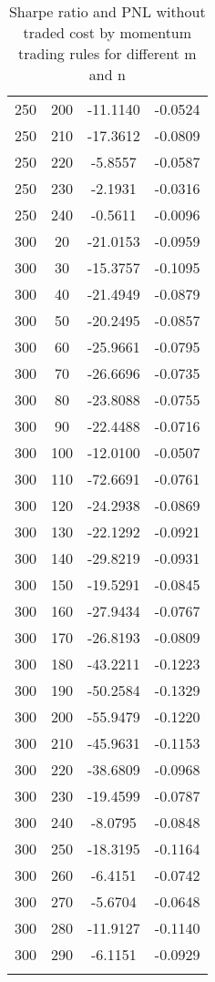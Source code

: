 \documentclass[11pt]{article}
\begin{document}
\begin{center}
\begin{longtable}{cccc}
    250 &   200 & -11.1140 & -0.0524 \\ 
    250 &   210 & -17.3612 & -0.0809 \\ 
    250 &   220 & -5.8557 & -0.0587 \\ 
    250 &   230 & -2.1931 & -0.0316 \\ 
    250 &   240 & -0.5611 & -0.0096 \\ 
    300 &    20 & -21.0153 & -0.0959 \\ 
    300 &    30 & -15.3757 & -0.1095 \\ 
    300 &    40 & -21.4949 & -0.0879 \\ 
    300 &    50 & -20.2495 & -0.0857 \\ 
    300 &    60 & -25.9661 & -0.0795 \\ 
    300 &    70 & -26.6696 & -0.0735 \\ 
    300 &    80 & -23.8088 & -0.0755 \\ 
    300 &    90 & -22.4488 & -0.0716 \\ 
    300 &   100 & -12.0100 & -0.0507 \\ 
    300 &   110 & -72.6691 & -0.0761 \\ 
    300 &   120 & -24.2938 & -0.0869 \\ 
    300 &   130 & -22.1292 & -0.0921 \\ 
    300 &   140 & -29.8219 & -0.0931 \\ 
    300 &   150 & -19.5291 & -0.0845 \\ 
    300 &   160 & -27.9434 & -0.0767 \\ 
    300 &   170 & -26.8193 & -0.0809 \\ 
    300 &   180 & -43.2211 & -0.1223 \\ 
    300 &   190 & -50.2584 & -0.1329 \\ 
    300 &   200 & -55.9479 & -0.1220 \\ 
    300 &   210 & -45.9631 & -0.1153 \\ 
    300 &   220 & -38.6809 & -0.0968 \\ 
    300 &   230 & -19.4599 & -0.0787 \\ 
    300 &   240 & -8.0795 & -0.0848 \\ 
    300 &   250 & -18.3195 & -0.1164 \\ 
    300 &   260 & -6.4151 & -0.0742 \\ 
    300 &   270 & -5.6704 & -0.0648 \\ 
    300 &   280 & -11.9127 & -0.1140 \\ 
    300 &   290 & -6.1151 & -0.0929 \\ 
   \hline
\caption{Sharpe ratio and PNL without traded cost by momentum trading rules for different m and n}\label{mom_notc}
\end{longtable}
\end{center}
\end{document}

